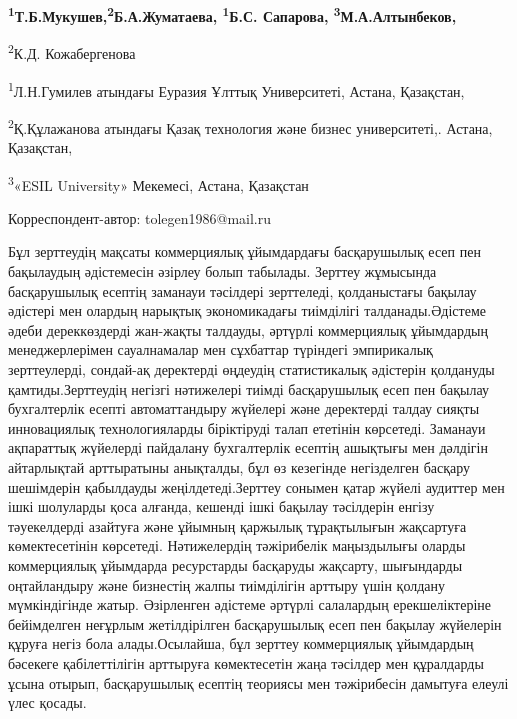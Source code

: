 

\begin{articleheader}


{\bfseries \textsuperscript{1}Т.Б.Мукушев\textsuperscript{\envelope },\textsuperscript{2}Б.А.Жуматаева, \textsuperscript{1}Б.С.
Сапарова, \textsuperscript{3}М.А.Алтынбеков,

\textsuperscript{2}К.Д. Кожабергенова }
\end{articleheader}
\begin{affiliation}

\textsuperscript{1}Л.Н.Гумилев атындағы Еуразия Ұлттық Университеті,
Астана, Қазақстан,

\textsuperscript{2}Қ.Құлажанова атындағы Қазақ технология және бизнес
университеті,. Астана, Қазақстан,

\textsuperscript{3}«ESIL University» Мекемесі, Астана, Қазақстан

\raggedright{\bfseries \textsuperscript{\envelope }}Корреспондент-автор: tolegen1986@mail.ru
\end{affiliation}

Бұл зерттеудің мақсаты коммерциялық ұйымдардағы басқарушылық есеп пен
бақылаудың әдістемесін әзірлеу болып табылады. Зерттеу жұмысында
басқарушылық есептің заманауи тәсілдері зерттеледі, қолданыстағы бақылау
әдістері мен олардың нарықтық экономикадағы тиімділігі
талданады.Әдістеме әдеби дереккөздерді жан-жақты талдауды, әртүрлі
коммерциялық ұйымдардың менеджерлерімен сауалнамалар мен сұхбаттар
түріндегі эмпирикалық зерттеулерді, сондай-ақ деректерді өңдеудің
статистикалық әдістерін қолдануды қамтиды.Зерттеудің негізгі нәтижелері
тиімді басқарушылық есеп пен бақылау бухгалтерлік есепті автоматтандыру
жүйелері және деректерді талдау сияқты инновациялық технологияларды
біріктіруді талап ететінін көрсетеді. Заманауи ақпараттық жүйелерді
пайдалану бухгалтерлік есептің ашықтығы мен дәлдігін айтарлықтай
арттыратыны анықталды, бұл өз кезегінде негізделген басқару шешімдерін
қабылдауды жеңілдетеді.Зерттеу сонымен қатар жүйелі аудиттер мен ішкі
шолуларды қоса алғанда, кешенді ішкі бақылау тәсілдерін енгізу
тәуекелдерді азайтуға және ұйымның қаржылық тұрақтылығын жақсартуға
көмектесетінін көрсетеді. Нәтижелердің тәжірибелік маңыздылығы оларды
коммерциялық ұйымдарда ресурстарды басқаруды жақсарту, шығындарды
оңтайландыру және бизнестің жалпы тиімділігін арттыру үшін қолдану
мүмкіндігінде жатыр. Әзірленген әдістеме әртүрлі салалардың
ерекшеліктеріне бейімделген неғұрлым жетілдірілген басқарушылық есеп пен
бақылау жүйелерін құруға негіз бола алады.Осылайша, бұл зерттеу
коммерциялық ұйымдардың бәсекеге қабілеттілігін арттыруға көмектесетін
жаңа тәсілдер мен құралдарды ұсына отырып, басқарушылық есептің теориясы
мен тәжірибесін дамытуға елеулі үлес қосады.


